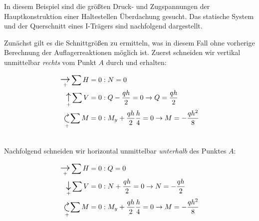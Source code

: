 \begin{example}
	In diesem Beispiel sind die größten Druck- und Zugspannungen der Hauptkonstruktion einer Haltestellen Überdachung gesucht.
	Das statische System und der Querschnitt eines I-Trägers sind nachfolgend dargestellt. 
	\begin{center}
		
	\end{center}
	Zunächst gilt es die Schnittgrößen zu ermitteln, was in diesem Fall ohne vorherige Berechnung der Auflagerreaktionen möglich ist.
	Zuerst schneiden wir vertikal unmittelbar \emph{rechts} vom Punkt $A$ durch und erhalten:\\
	\begin{minipage}{0.4\textwidth}
	\begin{flushright}
		
	\end{flushright}
	\end{minipage}
	\begin{minipage}{0.5\textwidth}
	\begin{equation*}
	\begin{split}
	\pnr\sum H=0:& \; N = 0 \\
	\pqo\sum V=0:& \; Q - \dfrac{qh}{2}=0 \rightarrow Q = \dfrac{qh}{2} \\
	\pml\sum M=0:& \; M_y + \dfrac{qh}{2}\dfrac{h}{4} = 0\rightarrow M = -\dfrac{qh^2}{8} 
	\end{split}
	\end{equation*}
	\end{minipage}\\
	
	Nachfolgend schneiden wir horizontal unmittelbar \emph{unterhalb}  des Punktes $A$: \\
	\begin{minipage}{0.4\textwidth}
		\begin{flushright}
			
		\end{flushright}
	\end{minipage}
	\begin{minipage}{0.5\textwidth}
		\begin{equation*}
		\begin{split}
		\pnr\sum H=0:& \; Q = 0 \\
		\pqu\sum V=0:& \; N + \dfrac{qh}{2}=0 \rightarrow N = -\dfrac{qh}{2} \\
		\pml\sum M=0:& \; M_y + \dfrac{qh}{2}\dfrac{h}{4} = 0\rightarrow M = -\dfrac{qh^2}{8} 
		\end{split}
		\end{equation*}
	\end{minipage}
	

\end{example}

